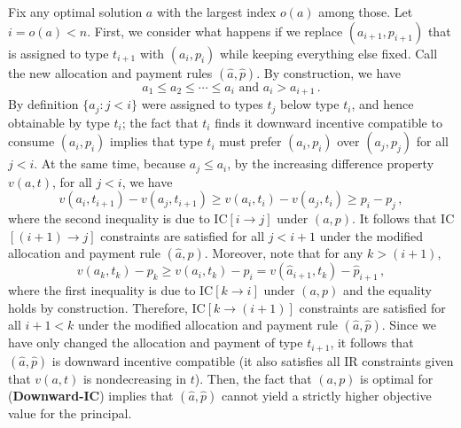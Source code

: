 \documentclass[12pt,letterpaper]{article}
\newenvironment{original}{\color{black}\noindent}{}
\theoremstyle{plain}
\theoremstyle{definition}
\theoremstyle{remark}
\renewcommand{\1}{\mathds{1}}
\theoremstyle{definition}
\begin{document}
\begin{original}
Fix any optimal solution $a$ with the largest index $o(a)$ among those. Let $i = o(a) < n$. First, we consider what happens if we replace $(a_{i+1}, p_{i+1})$ that is assigned to type $t_{i+1}$ with $(a_i, p_i)$ while keeping everything else fixed. Call the new allocation and payment rules $(\hat{a}, \hat{p})$. By construction, we have
\[a_1 \leq a_2 \leq \cdots \leq a_i \text{ and } a_i > a_{i+1}\,.\]
By definition $\{a_j: j < i\}$ were assigned to types $t_j$ below type $t_i$, and hence obtainable by type $t_i$; the fact that $t_i$ finds it downward incentive compatible to consume $(a_i, p_i)$ implies that type $t_i$ must prefer  $(a_i, p_i)$ over $(a_j, p_j)$ for all $j < i$.  At the same time, because $a_j \leq a_i$, by the increasing difference property $v(a, t)$, for all $j < i$, we have
\[v(a_i, t_{i+1}) - v(a_j, t_{i+1}) \geq v(a_i, t_{i}) - v(a_j, t_{i}) \geq p_i - p_j \,, \]
where the second inequality is due to IC$[i \rightarrow j]$ under $(a, p)$. It follows that IC$[(i+1) \rightarrow j]$ constraints are satisfied for all $j < i+1$ under the modified allocation and payment rule $(\hat{a}, \hat{p})$. Moreover, note that for any $k > (i+1)$,
\[v(a_k, t_k) - p_k \geq v(a_{i}, t_k) - p_i = v(\hat{a}_{i+1}, t_k) - \hat{p}_{i+1}\,,\]
where the first inequality is due to IC$[k \rightarrow i]$ under $(a, p)$ and the equality holds by construction. Therefore, IC$[k \rightarrow (i+1)]$ constraints are satisfied for all $i+1 < k$ under the modified allocation and payment rule $(\hat{a}, \hat{p})$. Since we have only changed the allocation and payment of type $t_{i+1}$, it follows that $(\hat{a}, \hat{p})$ is downward incentive compatible (it also satisfies all IR constraints given that $v(a, t)$ is nondecreasing in $t$). Then, the fact that $(a, p)$ is optimal for (\textbf{Downward-IC}) implies that $(\hat{a}, \hat{p})$ cannot yield a strictly higher objective value for the principal.
\end{original}
\end{document}
